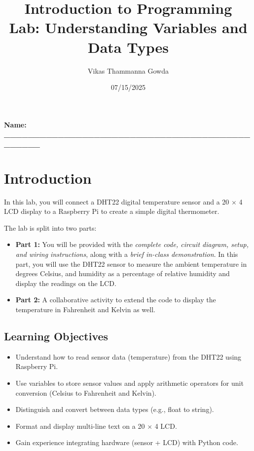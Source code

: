 \documentclass[a4paper,11pt]{article}
\title{Introduction to Programming \\ Lab: Understanding Variables and Data Types}
\author{Vikas Thammanna Gowda}
\date{07/15/2025}
\begin{document}
\maketitle

\noindent \textbf{Name: \_\_\_\_\_\_\_\_\_\_\_\_\_\_\_\_\_\_\_\_\_\_\_\_\_\_\_\_\_\_\_\_\_\_\_\_\_\_\_\_\_\_\_\_\_\_\_}
\section*{Introduction}
In this lab, you will connect a DHT22 digital temperature sensor and a 20 $\times$ 4 LCD display 
to a Raspberry Pi to create a simple digital thermometer. 

The lab is split into two parts: 
\begin{itemize}
\item \textbf{Part 1:} You will be provided with the \textit{complete code, circuit diagram, setup, 
and wiring instructions}, along with a \textit{brief in-class demonstration}. In this part, 
you will use the DHT22 sensor to measure the ambient temperature in 
degrees Celsius, and humidity as a percentage of relative humidity and display the readings on the LCD. 

\item \textbf{Part 2:} A collaborative activity to extend the code to display the 
temperature in Fahrenheit and Kelvin as well.

\end{itemize} 

\subsection*{Learning Objectives}
\begin{itemize}
    \item Understand how to read sensor data (temperature) from the DHT22 using Raspberry Pi.

\item Use variables to store sensor values and apply arithmetic operators for unit conversion (Celsius to Fahrenheit and Kelvin).

\item Distinguish and convert between data types (e.g., float to string).

\item Format and display multi-line text on a 20 $\times$ 4 LCD.

\item Gain experience integrating hardware (sensor + LCD) with Python code.

\end{itemize}
\end{document}
